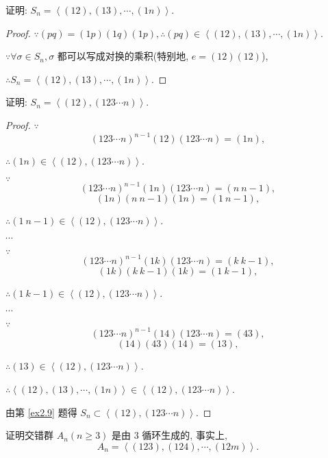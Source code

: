 \documentclass[color=black,device=normal,lang=cn,mode=geye]{elegantnote}
\begin{document}
\begin{exercise}\label{ex2.9}
    证明: $S_n=\left<(12),(13),\cdots,(1n)\right>$.
\end{exercise}
\begin{proof}
    $\because(pq)=(1p)(1q)(1p),\therefore(pq)\in\left<(12),(13),\cdots,(1n)\right>$.

    $\because\forall\sigma\in S_n,\sigma$ 都可以写成对换的乘积(特别地, $e=(12)(12)$),
    
    $\therefore S_n=\left<(12),(13),\cdots,(1n)\right>$.
\end{proof}
\begin{exercise}\label{ex2.10}
    证明: $S_n=\left<(12),(123\cdots n)\right>$.
\end{exercise}
\begin{proof}
    $\because$
    \[(123\cdots n)^{n-1}(12)(123\cdots n)=(1n),\]

    $\therefore(1n)\in\left<(12),(123\cdots n)\right>$.

    $\because$
    \[(123\cdots n)^{n-1}(1n)(123\cdots n)=(n\ n-1),\]
    \[(1n)(n\ n-1)(1n)=(1\ n-1),\]

    $\therefore(1\ n-1)\in\left<(12),(123\cdots n)\right>$.

    $\cdots$

    $\because$
    \[(123\cdots n)^{n-1}(1k)(123\cdots n)=(k\ k-1),\]
    \[(1k)(k\ k-1)(1k)=(1\ k-1),\]

    $\therefore(1\ k-1)\in\left<(12),(123\cdots n)\right>$.

    $\cdots$

    $\because$
    \[(123\cdots n)^{n-1}(14)(123\cdots n)=(43),\]
    \[(14)(43)(14)=(13),\]

    $\therefore(13)\in\left<(12),(123\cdots n)\right>$.

    $\therefore\left<(12),(13),\cdots,(1n)\right>\in\left<(12),(123\cdots n)\right>$.

    由第 \ref{ex2.9} 题得 $S_n\subset\left<(12),(123\cdots n)\right>$.
\end{proof}
\begin{exercise}
    证明交错群 $A_n(n\geq3)$ 是由 $3$ 循环生成的, 事实上,
    \[A_n=\left<(123),(124),\cdots,(12m)\right>.\]
\end{exercise}
\end{document}
